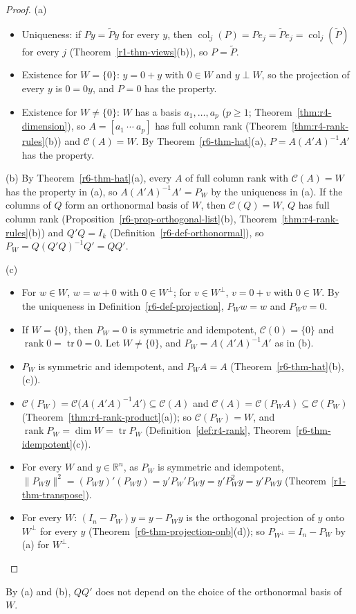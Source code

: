 \documentclass[12pt]{article}
\newcommand{\R}{\mathbb R}
\DeclareMathOperator{\tr}{tr}
\DeclareMathOperator{\col}{col}
\DeclareMathOperator{\rank}{rank}
\theoremstyle{definition}
\begin{document}
\begin{proof}
(a)
\begin{itemize}
\item Uniqueness: if \(Py=\tilde Py\) for every \(y\), then \(\col_j(P)=Pe_j=\tilde Pe_j=\col_j(\tilde P)\) for every
\(j\) (Theorem~\ref{r1-thm-views}(b)), so \(P=\tilde P\).
\item Existence for \(W=\{0\}\): \(y=0+y\) with \(0\in W\) and \(y\perp W\), so the projection of every \(y\) is
\(0=0y\), and \(P=0\) has the property.
\item Existence for \(W\ne\{0\}\): \(W\) has a basis \(a_1,\dots,a_p\) (\(p\geqslant1\); Theorem~\ref{thm:r4-dimension}),
so \(A=[a_1\ \cdots\ a_p]\) has full column rank (Theorem~\ref{thm:r4-rank-rules}(b)) and \(\mathcal C(A)=W\).
By Theorem~\ref{r6-thm-hat}(a), \(P=A(A'A)^{-1}A'\) has the property.
\end{itemize}
(b) By Theorem~\ref{r6-thm-hat}(a), every \(A\) of full column rank with \(\mathcal C(A)=W\) has the property in (a), so
\(A(A'A)^{-1}A'=P_W\) by the uniqueness in (a). If the columns of \(Q\) form an orthonormal basis of \(W\), then
\(\mathcal C(Q)=W\), \(Q\) has full column rank (Proposition~\ref{r6-prop-orthogonal-list}(b),
Theorem~\ref{thm:r4-rank-rules}(b)) and \(Q'Q=I_k\) (Definition~\ref{r6-def-orthonormal}), so
\(P_W=Q(Q'Q)^{-1}Q'=QQ'\).

(c)
\begin{itemize}
\item For \(w\in W\), \(w=w+0\) with \(0\in W^\perp\); for \(v\in W^\perp\), \(v=0+v\) with \(0\in W\). By the
uniqueness in Definition~\ref{r6-def-projection}, \(P_Ww=w\) and \(P_Wv=0\).
\item If \(W=\{0\}\), then \(P_W=0\) is symmetric and idempotent, \(\mathcal C(0)=\{0\}\) and
\(\rank0=\tr0=0\). Let \(W\ne\{0\}\), and \(P_W=A(A'A)^{-1}A'\) as in (b).
\item \(P_W\) is symmetric and idempotent, and \(P_WA=A\) (Theorem~\ref{r6-thm-hat}(b),(c)).
\item \(\mathcal C(P_W)=\mathcal C\bigl(A(A'A)^{-1}A'\bigr)\subseteq\mathcal C(A)\) and
\(\mathcal C(A)=\mathcal C(P_WA)\subseteq\mathcal C(P_W)\) (Theorem~\ref{thm:r4-rank-product}(a)); so
\(\mathcal C(P_W)=W\), and \(\rank P_W=\dim W=\tr P_W\) (Definition~\ref{def:r4-rank},
Theorem~\ref{r6-thm-idempotent}(c)).
\item For every \(W\) and \(y\in\R^n\), as \(P_W\) is symmetric and idempotent,
\(\lVert P_Wy\rVert^2=(P_Wy)'(P_Wy)=y'P_W'P_Wy=y'P_W^2y=y'P_Wy\) (Theorem~\ref{r1-thm-transpose}).
\item For every \(W\): \((I_n-P_W)y=y-P_Wy\) is the orthogonal projection of \(y\) onto \(W^\perp\) for every \(y\)
(Theorem~\ref{r6-thm-projection-onb}(d)); so \(P_{W^\perp}=I_n-P_W\) by (a) for \(W^\perp\).\qedhere
\end{itemize}
\end{proof}
By (a) and (b), \(QQ'\) does not depend on the choice of the orthonormal basis of \(W\).
\end{document}
